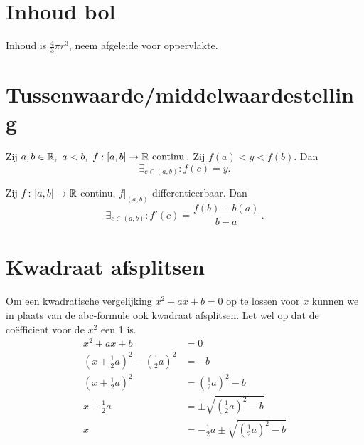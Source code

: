 \documentclass{article}
\begin{document}
    \section{Inhoud bol}\label{sec:inhoudBol}
    Inhoud is $\frac{4}{3} \pi r^3$, neem afgeleide voor oppervlakte.

    \section{Tussenwaarde/middelwaardestelling}\label{sec:tussenwaarde/middelwaardestelling}
    \begin{stelling}

        Zij $a,b \in \mathbb{R},\ a<b,\
            f:[a,b]\to \mathbb{R} \text{ continu}\,.
        $
        Zij $f(a)<y<f(b)$.
        Dan \[ \exists_{c\in(a,b)}:f(c)=y. \]
    \end{stelling}

    \begin{stelling}

        Zij $f\colon[a,b] \to \mathbb{R}$ continu, $f|_{(a,b)}$ differentieerbaar.
        Dan
        \[
            \exists_{c \in (a,b)} : f'(c) = \frac{f(b)-b(a)}{b-a}\,.
        \]
    \end{stelling}

    \section{Kwadraat afsplitsen}\label{sec:kwadraatAfsplitsen}
    Om een kwadratische vergelijking $x^2 + ax + b = 0$ op te lossen voor $x$ kunnen we in plaats van de abc-formule ook kwadraat afsplitsen.
    Let wel op dat de co\"efficient voor de $x^2$ een 1 is.
    \begin{align*}
        x^2 + a x + b &= 0 \\
        \left(x + \frac{1}{2} a\right)^2 - \left( \frac{1}{2}a \right)^2 &= - b \\
        \left(x + \frac{1}{2} a\right)^2 &= \left( \frac{1}{2}a \right)^2 - b \\
        x + \frac{1}{2} a &= \pm \sqrt{\left( \frac{1}{2}a \right)^2 - b} \\
        x &= -  \frac{1}{2} a \pm \sqrt{\left(\frac{1}{2}a \right)^2 - b}
    \end{align*}

    \newpage
\end{document}
